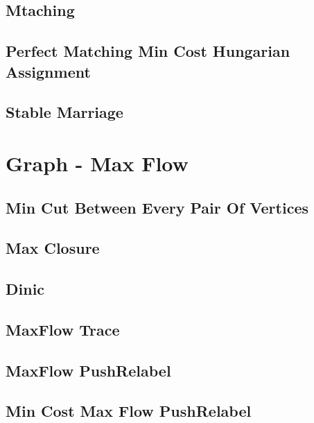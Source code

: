 \subsection{Mtaching}
\raggedbottom
\hrulefill
\subsection{Perfect Matching Min Cost Hungarian Assignment}
\raggedbottom
\hrulefill
\subsection{Stable Marriage}
\raggedbottom
\hrulefill

\section{Graph - Max Flow}
\subsection{Min Cut Between Every Pair Of Vertices}
\raggedbottom
\hrulefill
\subsection{Max Closure}
\raggedbottom
\hrulefill
\subsection{Dinic}
\raggedbottom
\hrulefill
\subsection{MaxFlow Trace}
\raggedbottom
\hrulefill
\subsection{MaxFlow PushRelabel}
\raggedbottom
\hrulefill
\subsection{Min Cost Max Flow PushRelabel}
\raggedbottom
\hrulefill
